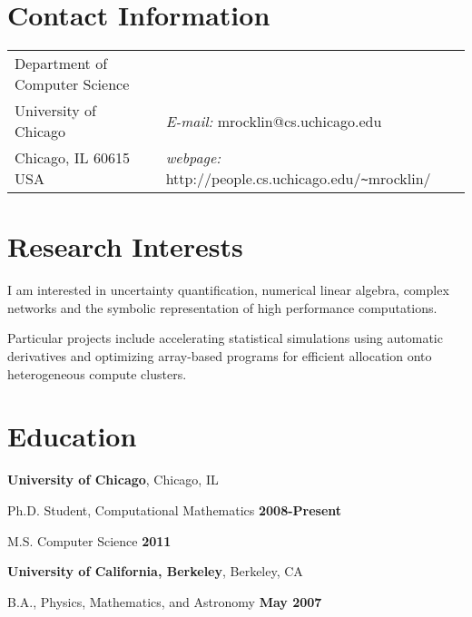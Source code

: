 \documentclass[margin,line]{res}
\newenvironment{list1}{
  \begin{list}{\ding{113}}{%
      \setlength{\itemsep}{0in}
      \setlength{\parsep}{0in} \setlength{\parskip}{0in}
      \setlength{\topsep}{0in} \setlength{\partopsep}{0in} 
      \setlength{\leftmargin}{0.17in}}}{\end{list}}
\begin{document}
\newcommand{\link}[1]{\texttt{#1}}


\begin{resume}
\section{\sc Contact Information}
\vspace{.05in}
\begin{tabular}{@{}p{2in}p{4in}}
Department of Computer Science   &         \\ 
University of Chicago & {\it E-mail:}  mrocklin@cs.uchicago.edu\\       
Chicago, IL  60615 USA  & {\it webpage:} http://people.cs.uchicago.edu/\verb+~+mrocklin/ \\     
\end{tabular}


\section{\sc Research Interests}

I am interested in uncertainty quantification, numerical linear algebra, complex networks and the symbolic representation of high performance computations. 

Particular projects include accelerating statistical simulations using automatic derivatives and optimizing array-based programs for efficient allocation onto heterogeneous compute clusters. 

\section{\sc Education}
{\bf University of Chicago}, Chicago, IL\\
\vspace*{-.1in}
\begin{list1}
\item[] Ph.D. Student, Computational Mathematics \hfill {\bf 2008-Present}
\item[] M.S. Computer Science \hfill {\bf 2011}
\end{list1}

{\bf University of California, Berkeley}, Berkeley, CA\\
\vspace*{-.1in}
\begin{list1}
\item[] B.A., Physics, Mathematics, and Astronomy \hfill {\bf May 2007}
\end{list1}


\end{resume}
\end{document}
